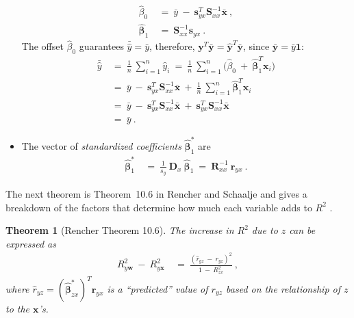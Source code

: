 \documentclass{article}
\newtheorem{theorem}{Theorem}
\newcommand\Br{\bm{r}}
\newcommand\Bs{\bm{s}}
\newcommand\Bw{\bm{w}}
\newcommand\Bx{\bm{x}}
\newcommand\By{\bm{y}}
\newcommand\BD{\bm{D}}
\newcommand\BR{\bm{R}}
\newcommand\BS{\bm{S}}
\newcommand\Bbe{\bm{\beta}}
\newcommand\BOn{\bm{1}}
\begin{document}
\begin{appendices}
\begin{itemize}
 \begin{align}
   \hat{\beta}_0 \ &= \ \bar{y} \ - \ \Bs_{yx}^T \BS_{xx}^{-1}
                     \bar{\Bx} \ , \\
   \hat{\Bbe}_1 \ &= \ \BS_{xx}^{-1} \Bs_{yx} \ .
 \end{align}
 The offset $\hat{\beta}_0$ guarantees $\bar{\hat{y}}=\bar{y}$,
 therefore, $\By^{T}\bar{\By} =  \hat{\By}^{T} \bar{\By}$,
 since $\bar{\By}=\bar{y} \BOn$:
 \begin{align}
  \bar{\hat{y}} \ &= \    \frac{1}{n} \
  \sum_{i=1}^{n} \hat{y}_i \ = \ \frac{1}{n} \
  \sum_{i=1}^{n} \big( \hat{\beta}_0 \ + \ \hat{\Bbe}_1^T \Bx_i \big) \\ \nonumber
   &= \ \bar{y} \ - \ \Bs_{yx}^T \BS_{xx}^{-1} \bar{\Bx} \ + \ \frac{1}{n} \ \sum_{i=1}^{n} 
                              \hat{\Bbe}_1^T \Bx_i\\ \nonumber
   &= \ \bar{y} \ - \ \Bs_{yx}^T \BS_{xx}^{-1} \bar{\Bx} \ + \
     \Bs_{yx}^T \BS_{xx}^{-1} \bar{\Bx}\\ \nonumber
   &= \ \bar{y} \ .
 \end{align}

 
\item The vector of {\em standardized coefficients} $\hat{\Bbe}^{*}_1$ are
 \begin{align}
   \hat{\Bbe}^{*}_1   \ &= \ \frac{1}{s_y} \ \BD_x \ \hat{\Bbe}_1 \ =
  \ \BR_{xx}^{-1} \ \Br_{yx} \ .
\end{align}
\end{itemize}


The next theorem is Theorem~10.6 in Rencher and Schaalje \cite{Rencher:08}
and gives a breakdown of the factors that determine how much
each variable adds to $R^2$ \cite[Chapter 10.6, p.~263]{Rencher:08}.
\begin{theorem}[Rencher Theorem 10.6]
The increase in $R^2$ due to $z$ can be expressed as
\begin{align}
\label{eq:increase}
  R^2_{y\Bw} \ - \ R^2_{y\Bx} \ &= \ \frac{(\hat{r}_{yz} \ -  \ 
  r_{yz})^2}{1 \ - \ R^2_{zx}} \ ,
\end{align}
where $\hat{r}_{yz}=(\hat{\Bbe}^*_{zx})^T \Br_{yx}$
is a ``predicted'' value of $r_{yz}$ based on the relationship of $z$ to
the $\Bx$'s.
\end{theorem}


\end{appendices}
\end{document}
